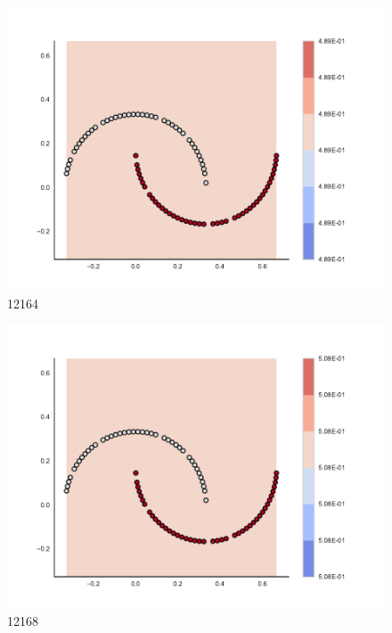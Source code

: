 \begin{subfigure}[b]{0.09\textwidth}
    \includegraphics[clip, trim=2.35cm 1.75cm 4.5cm 0cm,width=\textwidth]{img/convergence/12164.pdf}
    \caption{12164}
    \label{fig:convergence_12164}
\end{subfigure}
%
\begin{subfigure}[b]{0.09\textwidth}
    \includegraphics[clip, trim=2.35cm 1.75cm 4.5cm 0cm,width=\textwidth]{img/convergence/12168.pdf}
    \caption{12168}
    \label{fig:convergence_12168}
\end{subfigure}
%
